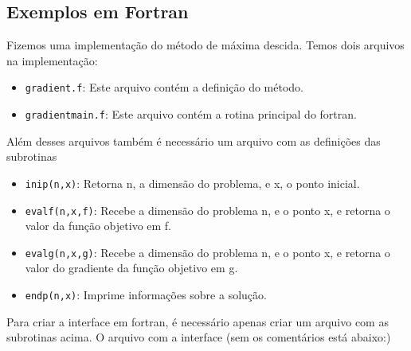 \subsection{Exemplos em Fortran}
Fizemos uma implementação do método de máxima descida. Temos dois arquivos na implementação:
\begin{itemize}
 \item \verb+gradient.f+: Este arquivo contém a definição do método.
 \item \verb+gradientmain.f+: Este arquivo contém a rotina principal do fortran.
\end{itemize}
Além desses arquivos também é necessário um arquivo com as definições das subrotinas
\begin{itemize}
 \item \verb+inip(n,x)+: Retorna n, a dimensão do problema, e x, o ponto inicial.
 \item \verb+evalf(n,x,f)+: Recebe a dimensão do problema n, e o ponto x, e retorna o
valor da função objetivo em f.
 \item \verb+evalg(n,x,g)+: Recebe a dimensão do problema n, e o ponto x, e retorna o
valor do gradiente da função objetivo em g.
 \item \verb+endp(n,x)+: Imprime informações sobre a solução.
\end{itemize}
Para criar a interface em fortran, é necessário apenas criar um arquivo com as subrotinas
acima.
O arquivo com a interface (sem os comentários está abaixo:)
